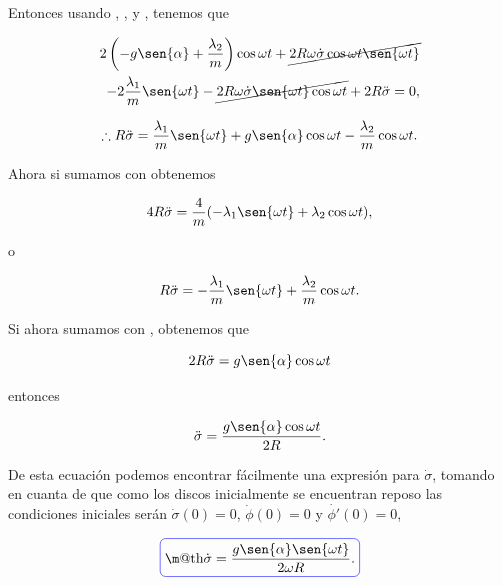 \documentclass[a4paper,10pt]{article}
\makeatletter
\numberwithin{equation}{section}
\newcommand*{\boxcolor}{blue}
\renewcommand{\boxed}[1]{\textcolor{\boxcolor}{%
\tikz[baseline={([yshift=-1ex]current bounding box.center)}] \node [rectangle, minimum width=1ex,rounded corners,draw] {\normalcolor\m@th$\displaystyle#1$};}}
\makeatother
\begin{document}
Entonces usando , ,  y 
, tenemos que 

\begin{align*}
 2 \left(- g\sen{\alpha} + \frac{\lambda_2}{m}\right)\cos{\omega t} 
 +\cancel{2R\omega\dot{\sigma}\cos{\omega t}\sen{\omega t}} \\
 - 2\frac{\lambda_1}{m}\sen{\omega t} 
 - \cancel{2R\omega\dot{\sigma}\sen{\omega t}\cos{\omega t}}  + 2R\ddot{\sigma} = 0,
\end{align*}

\begin{equation}
 \therefore R\ddot{\sigma} = \frac{\lambda_1}{m}\sen{\omega t} + g\sen{\alpha}\cos{\omega t}  - \frac{\lambda_2}{m}\cos{\omega t}. 
\label{eq:1Rsigma1}
\end{equation}

Ahora si sumamos  con  obtenemos 

\begin{equation}
4 R \ddot{\sigma} = \frac{4}{m}(-\lambda_1 \sen{\omega t} + \lambda_2 \cos{\omega t}),
\end{equation}

o

\begin{equation}
 R\ddot{\sigma} = -\frac{\lambda_1}{m} \sen{\omega t} + \frac{\lambda_2}{m} \cos{\omega t}.
\label{eq:1Rsigma2}
\end{equation}

Si ahora sumamos  con , obtenemos que 

\begin{equation}
 2R\ddot{\sigma} =  g\sen{\alpha}\cos{\omega t} 
\end{equation}

entonces

\begin{equation}
 \ddot{\sigma} = \frac{g\sen{\alpha}\cos{\omega t} }{2R}.
\end{equation}

De esta ecuación podemos encontrar fácilmente una expresión para $\dot{\sigma}$, tomando 
en cuanta de que como los discos inicialmente se encuentran reposo las condiciones 
iniciales serán $\dot{\sigma}(0) = 0$, $\dot{\phi}(0) = 0$ y $\dot{\phi'}(0) = 0$,

\begin{equation}
 \boxed{\dot{\sigma} = \frac{g\sen{\alpha}\sen{\omega t}}{2\omega R}.}
 \label{eq:1sigma1}
\end{equation}
\end{document}
